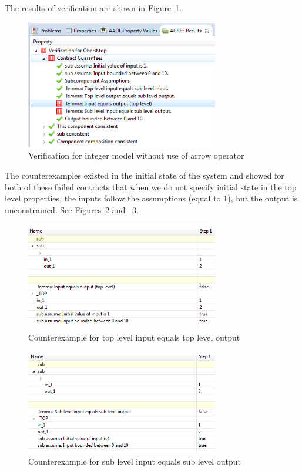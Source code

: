\documentclass{article}
\begin{document}
The results of verification are shown in Figure~\ref{fig:failed1}. 
\begin{figure}[h]
\begin{center}
\includegraphics[width=0.75\textwidth]{images/failed1} 
\caption{Verification for integer model without use of arrow operator}
\label{fig:failed1}
\end{center}
\end{figure}

The counterexamples existed in the initial state of the system and showed for both of these failed contracts that when we do not specify initial state in the top level properties, the inputs follow the assumptions (equal to 1), but the output is unconstrained. See Figures~\ref{fig:coex1} and ~\ref{fig:coex2}.
\begin{figure}[h]
\begin{center}
\includegraphics[width=0.75\textwidth]{images/coex1} 
\caption{Counterexample for top level input equals top level output}
\label{fig:coex1}
\end{center}
\end{figure}

\begin{figure}[h]
\begin{center}
\includegraphics[width=0.75\textwidth]{images/coex2} 
\caption{Counterexample for sub level input equals sub level output}
\label{fig:coex2}
\end{center}
\end{figure}
\end{document}
